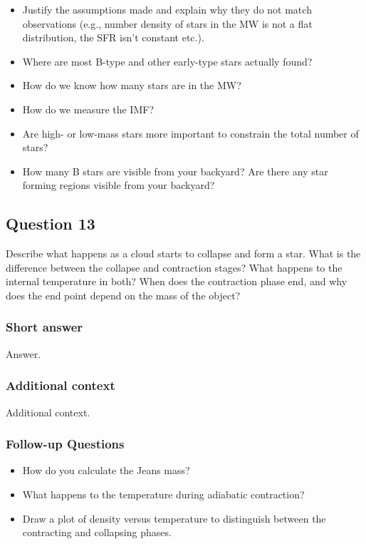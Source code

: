 \documentclass[a4paper,10pt]{article}
\begin{document}
\begin{itemize}
    \item Justify the assumptions made and explain why they do not match observations (e.g., number density of stars in the MW is not a flat distribution, the SFR isn't constant etc.).
    \item Where are most B-type and other early-type stars actually found?
    \item How do we know how many stars are in the MW?
    \item How do we measure the IMF?
    \item Are high- or low-mass stars more important to constrain the total number of stars?
    \item How many B stars are visible from your backyard? Are there any star forming regions visible from your backyard?
\end{itemize}


\newpage
\subsection{Question 13}

Describe what happens as a cloud starts to collapse and form a star. What is the difference between the collapse and contraction stages? What happens to the internal temperature in both? When does the contraction phase end, and why does the end point depend on the mass of the object?

\subsubsection{Short answer}

Answer.

\subsubsection{Additional context}

Additional context.

\subsubsection{Follow-up Questions}

\begin{itemize}
    \item How do you calculate the Jeans mass?
    \item What happens to the temperature during adiabatic contraction?
    \item Draw a plot of density versus temperature to distinguish between the contracting and collapsing phases.
\end{itemize}
\end{document}
